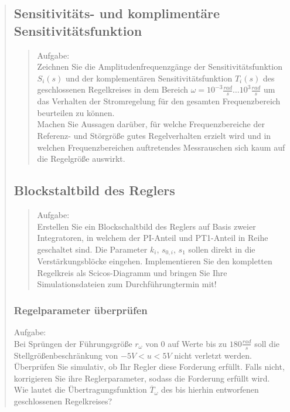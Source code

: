 \begin{quote}
    \subsection{Sensitivitäts- und komplimentäre Sensitivitätsfunktion}
    \begin{quote}
        Aufgabe:\\
        Zeichnen Sie die Amplitudenfrequenzgänge der Sensitivitätsfunktion $S_i(s)$ und der komplementären
        Sensitivitätsfunktion $T_i (s)$ des geschlossenen Regelkreises in dem Bereich $\omega = 10^{-3}\frac{rad}{s}
        \ldots 10^{3}\frac{rad}{s}$ um das Verhalten der Stromregelung für den gesamten Frequenzbereich beurteilen zu
        können.\\
        Machen Sie Aussagen darüber, für welche Frequenzbereiche der Referenz- und Störgröße gutes Regelverhalten
        erzielt wird und in welchen Frequenzbereichen auftretendes Messrauschen sich kaum auf die Regelgröße auswirkt.\\
        
                        
	\end{quote}
		
	\subsection{Blockstaltbild des Reglers}
    \begin{quote}
        Aufgabe:\\
        Erstellen Sie ein Blockschaltbild des Reglers auf Basis zweier Integratoren, in welchem der PI-Anteil und PT1-Anteil in Reihe geschaltet
        sind. Die Parameter $k_i$, $s_{0,i}$, $s_1$ sollen direkt in die Verstärkungsblöcke eingehen. Implementieren Sie
        den kompletten Regelkreis als Scicos-Diagramm und bringen Sie Ihre Simulationsdateien zum Durchführungtermin
        mit!
        
	 	
    \end{quote}
    
    \subsubsection{Regelparameter überprüfen}
        Aufgabe:\\
        Bei Sprüngen der Führungsgröße $r_\omega$ von $0$ auf Werte bis zu $180 \frac{rad}{s}$ soll die
        Stellgrößenbeschränkung von $−5V < u < 5V$ nicht verletzt werden. Überprüfen Sie simulativ, ob Ihr Regler
        diese Forderung erfüllt. Falls nicht, korrigieren Sie ihre Reglerparameter, sodass die Forderung erfüllt wird.
        Wie lautet die Übertragungsfunktion $\overline{T}_\omega$ des bis hierhin entworfenen geschlossenen
        Regelkreises?
        \begin{quote}
            
        \end{quote}
    
    


        
    
  
\end{quote}

